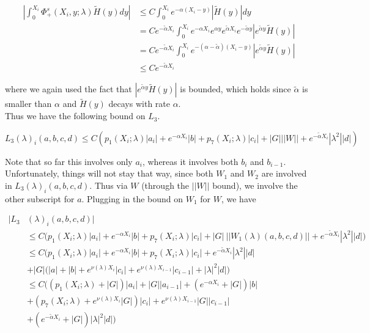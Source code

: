 \documentclass[12pt]{article}
\begin{document}
\begin{enumerate}
\begin{align*}
\left| \int_0^{X_i} \Phi^s_+(X_i, y; \lambda) \tilde{H}(y) dy \right| 
&\leq C \int_0^{X_i} e^{-\alpha (X_i - y)}|\tilde{H}(y)| dy \\
&= C e^{-\tilde{\alpha}X_i} \int_0^{X_i} e^{-\alpha X_i} e^{\alpha y}  e^{\tilde{\alpha}X_i} e^{-\tilde{\alpha}y} |e^{\tilde{\alpha}y} \tilde{H}(y)| \\
&= C e^{-\tilde{\alpha}X_i} \int_0^{X_i} e^{-(\alpha - \tilde{\alpha})(X_i-y)} |e^{\tilde{\alpha}y} \tilde{H}(y)|\\
&\leq C e^{-\tilde{\alpha}X_i} 
\end{align*}

where we again used the fact that $|e^{\tilde{\alpha}y} \tilde{H}(y)|$ is bounded, which holds since $\tilde{\alpha}$ is smaller than $\alpha$ and $\tilde{H}(y)$ decays with rate $\alpha$.\\

Thus we have the following bound on $L_3$.

\[
L_3(\lambda)_i(a, b, c, d) \leq C ( p_1(X_i; \lambda)|a_i|
+ e^{-\alpha X_i}|b| + p_7(X_i; \lambda)|c_i| + |G| ||W|| + e^{-\tilde{\alpha} X_i} |\lambda^2| |d| )
\]

Note that so far this involves only $a_i$, whereas it involves both $b_i$ and $b_{i-1}$. Unfortunately, things will not stay that way, since both $W_1$ and $W_2$ are involved in $L_3(\lambda)_i(a, b, c, d)$. Thus via $W$ (through the $||W||$ bound), we involve the other subscript for $a$. Plugging in the bound on $W_1$ for $W$, we have

\begin{align*}
|L_3&(\lambda)_i(a, b, c, d)| \\
&\leq C \Big( p_1(X_i; \lambda)|a_i|
+ e^{-\alpha X_i}|b| + p_7(X_i; \lambda)|c_i| + |G|\:||W_1(\lambda)(a,b,c,d)|| + e^{-\tilde{\alpha} X_i} |\lambda^2| |d| \Big) \\
& \leq C \Big( p_1(X_i; \lambda)|a_i|
+ e^{-\alpha X_i}|b| + p_7(X_i; \lambda)|c_i| + e^{-\tilde{\alpha} X_i} |\lambda^2| |d| \\
&+ |G| (|a| + |b| + e^{\nu(\lambda)X_i}|c_i| + e^{\nu(\lambda)X_{i-1}}|c_{i-1}| + |\lambda|^2 |d| \Big) \\
& \leq C \Big( (p_1(X_i; \lambda) + |G|)|a_i| + |G||a_{i-1}| + (e^{-\alpha X_i} + |G|) |b| \\
&+ ( p_7(X_i; \lambda) + e^{\nu(\lambda)X_i} |G|) |c_i| + e^{\nu(\lambda)X_{i-1}} |G| |c_{i-1}| \\
&+ (e^{-\tilde{\alpha} X_i} + |G|) |\lambda|^2 |d| \Big)
\end{align*} 


\end{enumerate}
\end{document}
